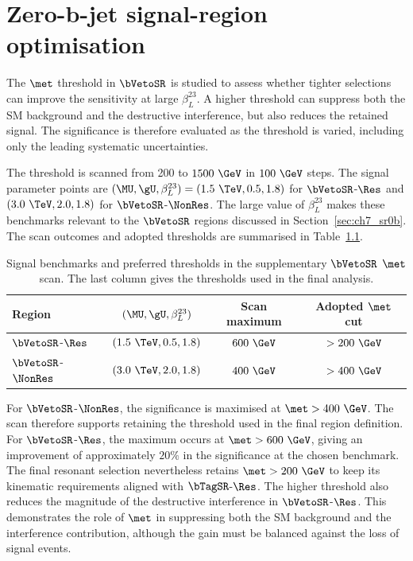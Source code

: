 \chapter{Zero-b-jet signal-region optimisation}
\label{app:sr0b_optimisation}

The $\met$ threshold in $\bVetoSR$ is studied to assess whether tighter selections can improve the sensitivity at large $\beta_L^{23}$.
A higher threshold can suppress both the SM background and the destructive interference, but also reduces the retained signal.
The significance is therefore evaluated as the threshold is varied, including only the leading systematic uncertainties.

The threshold is scanned from 200 to $1500~\GeV$ in $100~\GeV$ steps.
The signal parameter points are $(\MU,\gU,\beta_L^{23})=(1.5~\TeV,0.5,1.8)$ for $\bVetoSR$-$\Res$ and $(3.0~\TeV,2.0,1.8)$ for $\bVetoSR$-$\NonRes$.
The large value of $\beta_L^{23}$ makes these benchmarks relevant to the $\bVetoSR$ regions discussed in Section~\ref{sec:ch7_sr0b}.
The scan outcomes and adopted thresholds are summarised in Table~\ref{tab:app_sr0b_scan}.

\begin{table}[htbp]
    \centering
    \small
    \caption{Signal benchmarks and preferred thresholds in the supplementary $\bVetoSR$ $\met$ scan. The last column gives the thresholds used in the final analysis.}
    \label{tab:app_sr0b_scan}
    \begin{tabular}{lccc}
        \toprule
        Region & $(\MU,\gU,\beta_L^{23})$ & Scan maximum & Adopted $\met$ cut \\
        \midrule
        $\bVetoSR$-$\Res$ & $(1.5~\TeV,0.5,1.8)$ & $600~\GeV$ & $>200~\GeV$ \\
        $\bVetoSR$-$\NonRes$ & $(3.0~\TeV,2.0,1.8)$ & $400~\GeV$ & $>400~\GeV$ \\
        \bottomrule
    \end{tabular}
\end{table}

For $\bVetoSR$-$\NonRes$, the significance is maximised at $\met>400~\GeV$.
The scan therefore supports retaining the threshold used in the final region definition.
For $\bVetoSR$-$\Res$, the maximum occurs at $\met>600~\GeV$, giving an improvement of approximately $20\%$ in the significance at the chosen benchmark.
The final resonant selection nevertheless retains $\met>200~\GeV$ to keep its kinematic requirements aligned with $\bTagSR$-$\Res$.
The higher threshold also reduces the magnitude of the destructive interference in $\bVetoSR$-$\Res$.
This demonstrates the role of $\met$ in suppressing both the SM background and the interference contribution, although the gain must be balanced against the loss of signal events.
